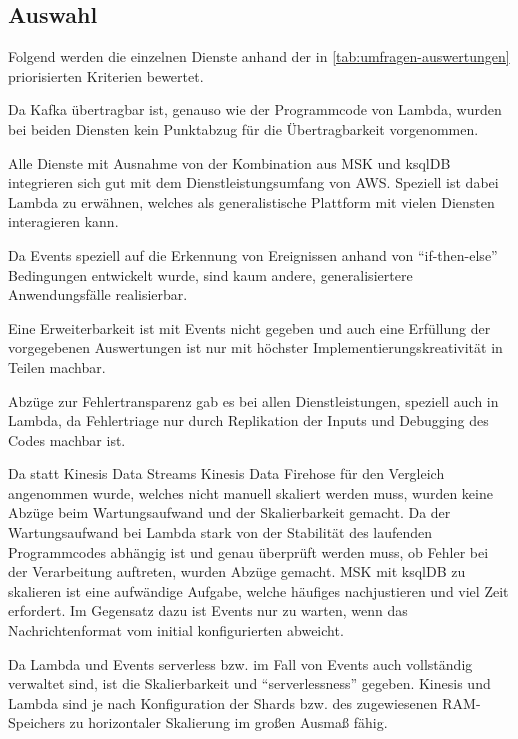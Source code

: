 \subsection{Auswahl}
Folgend werden die einzelnen Dienste anhand der in \autoref{tab:umfragen-auswertungen} priorisierten Kriterien bewertet.


Da Kafka übertragbar ist, genauso wie der Programmcode von Lambda, wurden bei beiden Diensten kein Punktabzug für die Übertragbarkeit vorgenommen.

Alle Dienste mit Ausnahme von der Kombination aus \ac{MSK} und ksqlDB integrieren sich gut mit dem Dienstleistungsumfang von \ac{AWS}. Speziell ist dabei Lambda zu erwähnen, welches als generalistische Plattform mit vielen Diensten interagieren kann.

Da \AWSIOT{} Events speziell auf die Erkennung von Ereignissen anhand von \enquote{if-then-else} Bedingungen entwickelt wurde, sind kaum andere, generalisiertere Anwendungsfälle realisierbar. 

Eine Erweiterbarkeit ist mit \AWSIOT{} Events nicht gegeben und auch eine Erfüllung der vorgegebenen Auswertungen ist nur mit höchster Implementierungskreativität in Teilen machbar.

Abzüge zur Fehlertransparenz gab es bei allen Dienstleistungen, speziell auch in Lambda, da Fehlertriage nur durch Replikation der Inputs und Debugging des Codes machbar ist.

Da statt Kinesis Data Streams Kinesis Data Firehose für den Vergleich angenommen wurde, welches nicht manuell skaliert werden muss, wurden keine Abzüge beim Wartungsaufwand und der Skalierbarkeit gemacht. Da der Wartungsaufwand bei Lambda stark von der Stabilität des laufenden Programmcodes abhängig ist und genau überprüft werden muss, ob Fehler bei der Verarbeitung auftreten, wurden Abzüge gemacht. \ac{MSK} mit ksqlDB zu skalieren ist eine aufwändige Aufgabe, welche häufiges nachjustieren und viel Zeit erfordert. Im Gegensatz dazu ist \AWSIOT{} Events nur zu warten, wenn das Nachrichtenformat vom initial konfigurierten abweicht.

Da Lambda und \AWSIOT{} Events serverless bzw. im Fall von \AWSIOT{} Events auch vollständig verwaltet sind, ist die Skalierbarkeit und \enquote{serverlessness} gegeben.
Kinesis und Lambda sind je nach Konfiguration der Shards bzw. des zugewiesenen \ac{RAM}-Speichers zu horizontaler Skalierung im großen Ausmaß fähig.

